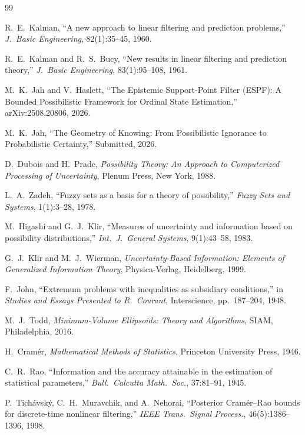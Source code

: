 \documentclass[12pt]{article}
\begin{document}
\begin{thebibliography}{99}

 R.\ E.\ Kalman, ``A new approach to linear filtering and prediction problems,'' \textit{J.\ Basic Engineering}, 82(1):35--45, 1960.

 R.\ E.\ Kalman and R.\ S.\ Bucy, ``New results in linear filtering and prediction theory,'' \textit{J.\ Basic Engineering}, 83(1):95--108, 1961.

 M.\ K.\ Jah and V.\ Haslett, ``The Epistemic Support-Point Filter (ESPF): A Bounded Possibilistic Framework for Ordinal State Estimation,'' arXiv:2508.20806, 2026.

 M.\ K.\ Jah, ``The Geometry of Knowing: From Possibilistic Ignorance to Probabilistic Certainty,'' Submitted, 2026.

 D.\ Dubois and H.\ Prade, \textit{Possibility Theory: An Approach to Computerized Processing of Uncertainty}, Plenum Press, New York, 1988.

 L.\ A.\ Zadeh, ``Fuzzy sets as a basis for a theory of possibility,'' \textit{Fuzzy Sets and Systems}, 1(1):3--28, 1978.

 M.\ Higashi and G.\ J.\ Klir, ``Measures of uncertainty and information based on possibility distributions,'' \textit{Int.\ J.\ General Systems}, 9(1):43--58, 1983.

 G.\ J.\ Klir and M.\ J.\ Wierman, \textit{Uncertainty-Based Information: Elements of Generalized Information Theory}, Physica-Verlag, Heidelberg, 1999.

 F.\ John, ``Extremum problems with inequalities as subsidiary conditions,'' in \textit{Studies and Essays Presented to R.\ Courant}, Interscience, pp.\ 187--204, 1948.

 M.\ J.\ Todd, \textit{Minimum-Volume Ellipsoids: Theory and Algorithms}, SIAM, Philadelphia, 2016.

 H.\ Cram\'{e}r, \textit{Mathematical Methods of Statistics}, Princeton University Press, 1946.

 C.\ R.\ Rao, ``Information and the accuracy attainable in the estimation of statistical parameters,'' \textit{Bull.\ Calcutta Math.\ Soc.}, 37:81--91, 1945.

 P.\ Tich\'{a}vsk\'{y}, C.\ H.\ Muravchik, and A.\ Nehorai, ``Posterior Cram\'{e}r--Rao bounds for discrete-time nonlinear filtering,'' \textit{IEEE Trans.\ Signal Process.}, 46(5):1386--1396, 1998.


\end{thebibliography}
\end{document}
